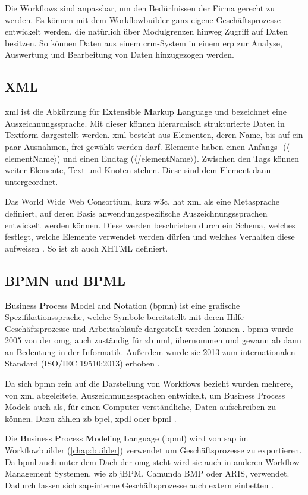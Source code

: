 Die Workflows sind anpassbar, um den Bedürfnissen der Firma gerecht zu werden. Es können mit dem Workflowbuilder ganz eigene Geschäftsprozesse entwickelt werden, die natürlich über Modulgrenzen hinweg Zugriff auf Daten besitzen. So können Daten aus einem \gls{crm}-System in einem \gls{erp} zur Analyse, Auswertung und Bearbeitung von Daten hinzugezogen werden.

\subsection{XML}
\label{sec:export-xml}

\gls{xml} ist die Abkürzung für E\textbf{x}tensible \textbf{M}arkup \textbf{L}anguage und bezeichnet eine Auszeichnungssprache. Mit dieser können hierarchisch strukturierte Daten in Textform dargestellt werden. \gls{xml} besteht aus Elementen, deren Name, bis auf ein paar Ausnahmen, frei gewählt werden darf. Elemente haben einen Anfangs- ($\langle$elementName$\rangle$) und einen Endtag ($\langle$/elementName$\rangle$). Zwischen den Tags können weiter Elemente, Text und Knoten stehen. Diese sind dem Element dann untergeordnet.

Das World Wide Web Consortium, kurz \gls{w3c}, hat \gls{xml} als eine Metasprache definiert, auf deren Basis anwendungsspezifische Auszeichnungssprachen entwickelt werden können. Diese werden beschrieben durch ein Schema, welches festlegt, welche Elemente verwendet werden dürfen und welches Verhalten diese aufweisen \cite{XML}. So ist \gls{zb} auch XHTML definiert.

\subsection{BPMN und BPML}
\label{sec:export-bpmn-bpml}

\textbf{B}usiness \textbf{P}rocess \textbf{M}odel and \textbf{N}otation (\gls{bpmn}) ist eine grafische Spezifikationssprache, welche Symbole bereitstellt mit deren Hilfe Geschäftsprozesse und Arbeitsabläufe dargestellt werden können \cite{BPMN}. \gls{bpmn} wurde 2005 von der \gls{omg}, auch zuständig für \gls{zb} \gls{uml}, übernommen und gewann ab dann an Bedeutung in der Informatik. Außerdem wurde sie 2013 zum internationalen Standard (ISO/IEC 19510:2013) erhoben \cite{OMG}.

Da sich \gls{bpmn} rein auf die Darstellung von Workflows bezieht wurden mehrere, von \gls{xml} abgeleitete, Auszeichnungssprachen entwickelt, um Business Process Models auch als, für einen Computer verständliche, Daten aufschreiben zu können. Dazu zählen \gls{zb} \gls{bpel}, \gls{xpdl} oder \gls{bpml} \cite{BPMN}.

Die \textbf{B}usiness \textbf{P}rocess \textbf{M}odeling \textbf{L}anguage (\gls{bpml}) wird von \gls{sap} im Workflowbuilder (\ref{chap:builder}) verwendet um Geschäftsprozesse zu exportieren. Da \gls{bpml} auch unter dem Dach der \gls{omg} steht wird sie auch in anderen Workflow Management Systemen, wie \gls{zb} jBPM, Camunda BMP oder ARIS, verwendet. Dadurch lassen sich \gls{sap}-interne Geschäftsprozesse auch extern einbetten \cite{BPML}.